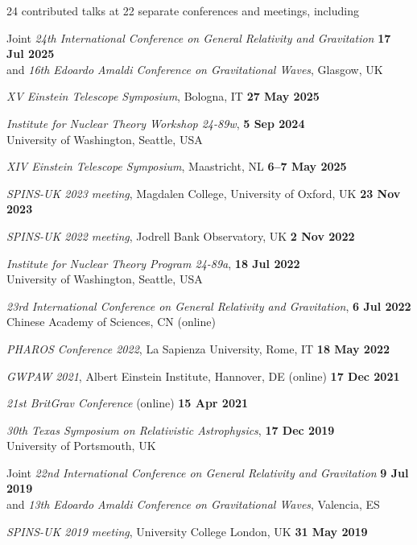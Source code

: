 24 contributed talks at 22 separate conferences and meetings, including
%
\begin{etaremune}
    \item Joint \textit{24th International Conference on General Relativity and
    Gravitation} \hfill \textbf{17 Jul 2025} \\
    and \textit{16th Edoardo Amaldi Conference on Gravitational Waves}, Glasgow, UK
    \item \textit{XV Einstein Telescope Symposium}, Bologna, IT
    \hfill \textbf{27 May 2025}
    \item \textit{Institute for Nuclear Theory Workshop 24-89w},
    \hfill \textbf{5 Sep 2024} \\
    University of Washington, Seattle, USA
    \item \textit{XIV Einstein Telescope Symposium}, Maastricht, NL
    \hfill \textbf{6--7 May 2025}
    \item \textit{SPINS-UK 2023 meeting}, 
    Magdalen College, University of Oxford, UK \hfill \textbf{23 Nov 2023}
    \item \textit{SPINS-UK 2022 meeting}, Jodrell Bank Observatory, UK
    \hfill \textbf{2 Nov 2022}
    \item \textit{Institute for Nuclear Theory Program 24-89a},
    \hfill \textbf{18 Jul 2022} \\
    University of Washington, Seattle, USA
    \item \textit{23rd International Conference on General Relativity and
    Gravitation}, \hfill \textbf{6 Jul 2022} \\
    Chinese Academy of Sciences, CN (online)
    \item \textit{PHAROS Conference 2022}, La Sapienza University, Rome, IT
    \hfill \textbf{18 May 2022}
    \item \textit{GWPAW 2021}, Albert Einstein Institute, Hannover, DE (online)
    \hfill \textbf{17 Dec 2021}
    \item \textit{21st BritGrav Conference} (online)
    \hfill \textbf{15 Apr 2021}
    \item \textit{30th Texas Symposium on Relativistic Astrophysics},
    \hfill \textbf{17 Dec 2019} \\
    University of Portsmouth, UK
    \item Joint \textit{22nd International Conference on General Relativity and
    Gravitation} \hfill \textbf{9 Jul 2019} \\
    and \textit{13th Edoardo Amaldi Conference on Gravitational Waves},
    Valencia, ES
    \item \textit{SPINS-UK 2019 meeting}, University College London, UK
    \hfill \textbf{31 May 2019}
\end{etaremune}


